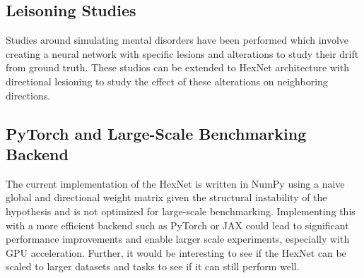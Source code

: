 \subsection{Leisoning Studies}

Studies around simulating mental disorders have been performed which involve creating a neural network with specific lesions and alterations to study their drift from ground truth.
These studios can be extended to HexNet architecture with directional lesioning to study the effect of these alterations on neighboring directions.

\subsection{PyTorch and Large-Scale Benchmarking Backend}

The current implementation of the HexNet is written in NumPy using a naive global and directional weight matrix given the structural instability of the hypothesis and is not optimized for large-scale benchmarking.
Implementing this with a more efficient backend such as PyTorch or JAX could lead to significant performance improvements and enable larger scale experiments, especially with GPU acceleration.
Further, it would be interesting to see if the HexNet can be scaled to larger datasets and tasks to see if it can still perform well.